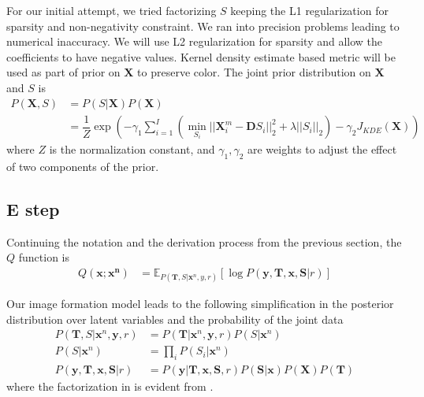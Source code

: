 For our initial attempt, we tried factorizing $S$ keeping the L1 regularization for sparsity and non-negativity constraint. We ran into precision problems leading to numerical inaccuracy. We will use L2 regularization for sparsity and allow the coefficients to have negative values. Kernel density estimate based metric will be used as part of prior on $\mathbf{X}$ to preserve color. The joint prior distribution on $\mathbf{X}$ and $S$ is
\begin{align}
P(\mathbf{X}, S) &= P(S | \mathbf{X}) P(\mathbf{X})  \nonumber \\
&= \dfrac{1}{Z} \exp \left( - \gamma_1 \sum_{i=1}^{I} \left( \min_{S_i} || \mathbf{X}_i^m - \mathbf{D} S_i ||_2^2 + \lambda || S_i ||_2 \right) - \gamma_2 J_{KDE} \left( \mathbf{X} \right) \right) \label{eqn:xSJointPrior}
\end{align}
where $Z$ is the normalization constant, and $\gamma_1, \gamma_2$ are weights to adjust the effect of two components of the prior.

\subsection{E step}
Continuing the notation and the derivation process from the previous section, the $Q$ function is
\begin{align}
    Q(\mathbf{x}; \mathbf{x^n}) &= \mathbb{E}_{ P \left( \mathbf{T}, S | \mathbf{x}^n, y, r \right)} \left[ \log P \left( \mathbf{y}, \mathbf{T}, \mathbf{x}, \mathbf{S} | r \right)\right] \label{eqn:Qvbem2}
\end{align}

Our image formation model leads to the following simplification in the posterior distribution over latent variables and the probability of the joint data
\begin{align}
    P \left( \mathbf{T}, S | \mathbf{x}^n, \mathbf{y}, r \right) &= P \left( \mathbf{T} | \mathbf{x}^n, \mathbf{y}, r \right) P \left( S | \mathbf{x}^n \right) \\
    P \left( S | \mathbf{x}^n\right) &= \prod_{i} P \left( S_i | \mathbf{x}^n \right) \label{eqn:obCodeFact} \\
    P \left( \mathbf{y}, \mathbf{T}, \mathbf{x}, \mathbf{S} | r \right) &= P \left( \mathbf{y} | \mathbf{T}, \mathbf{x}, \mathbf{S}, r \right) P \left( \mathbf{S} | \mathbf{x} \right) P \left( \mathbf{X} \right) P \left( \mathbf{T} \right)
\end{align}
where the factorization in  is evident from .

